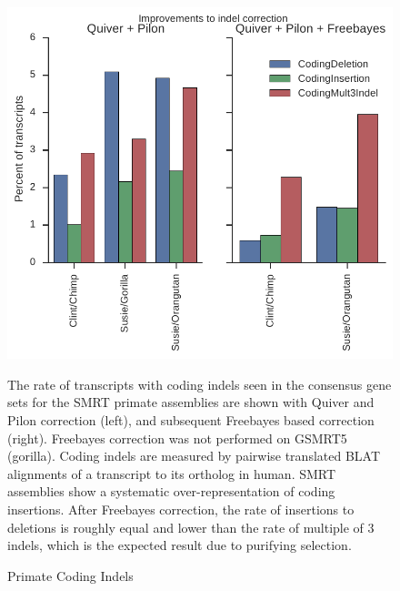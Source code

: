 \documentclass[fleqn,10pt]{wlscirep}
\begin{document}
\begin{figure}
\centering
\includegraphics[width=\textwidth,height=\textheight,keepaspectratio]{primate_indels.pdf}
\caption{Primate Coding Indels}
The rate of transcripts with coding indels seen in the consensus gene sets for the SMRT primate assemblies are shown with Quiver and Pilon correction (left), and subsequent Freebayes \cite{garrison2012haplotype} based correction (right). Freebayes correction was not performed on GSMRT5 (gorilla). Coding indels are measured by pairwise translated BLAT alignments of a transcript to its ortholog in human. SMRT assemblies show a systematic over-representation of coding insertions. After Freebayes correction, the rate of insertions to deletions is roughly equal and lower than the rate of multiple of 3 indels, which is the expected result due to purifying selection.
\label{supp_fig:primate_indels}
\end{figure}
\end{document}
